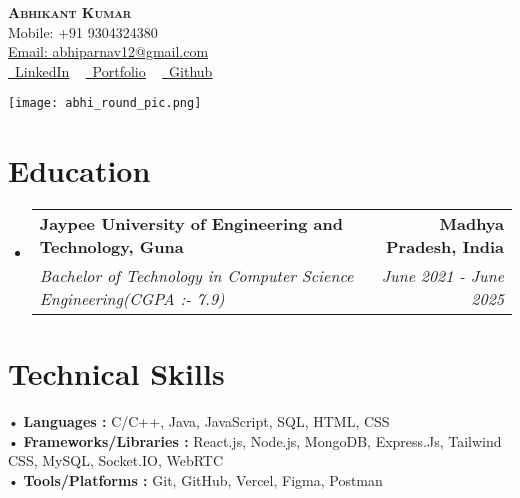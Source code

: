 \documentclass[letterpaper,11pt]{article}
\makeatletter
\newcommand{\resumeSubheading}[4]{
  \vspace{-2pt}\item
	\begin{tabular*}{1.0\textwidth}[t]{l@{\extracolsep{\fill}}r}
  	\textbf{#1} & \textbf{\small #2} \\
  	\textit{\small#3} & \textit{\small #4} \\
	\end{tabular*}\vspace{-7pt}
}
\newcommand{\resumeSubHeadingListStart}{\begin{itemize}[leftmargin=0.0in, label={}]}
\newcommand{\resumeSubHeadingListEnd}{\end{itemize}}
\makeatother
\begin{document}
\begin{minipage}[c]{0.4\textwidth}
    {\textbf{\Huge \scshape {Abhikant Kumar}}} \\ \vspace{3pt} 
    {Mobile: +91 9304324380}  \\ \vspace{3pt} 
    {\href{mailto:x@gmail.com}{Email: {abhiparnav12@gmail.com}}}  \\ \vspace{3pt} 
    {\href{https://linkedin.com/in//}{\raisebox{-0.2\height}\faLinkedin\ \underline{LinkedIn}} ~
    \href{https://abhikant-portfolio.netlify.app/}{\raisebox{-0.2\height}\faGlobe\ \underline{Portfolio}} ~ \href{https://github.com/abhikant12}{\raisebox{-0.2\height}\faGithub\ \underline{Github}}}    
\end{minipage}
\hfill
\begin{minipage}[c]{0.52\textwidth}
\begin{flushright}
    \texttt{[image: abhi\_round\_pic.png]}
\end{flushright}
\end{minipage}
\vspace{-16pt}

 
\section{Education}
\begin{itemize}[leftmargin=0.12in, label={}]
  \vspace{-6pt}
  \resumeSubHeadingListStart
	\resumeSubheading
  	{Jaypee University of Engineering and Technology, Guna}{Madhya Pradesh, India}
  	{Bachelor of Technology in Computer Science Engineering(CGPA  :-  7.9)}{June 2021 - June 2025}
   \vspace{1pt}
  \resumeSubHeadingListEnd
\end{itemize} 



\section{Technical Skills }
 \begin{itemize}[leftmargin=0.12in, label={}]
        \vspace{2pt}
	\small{\item{
 	\hspace{-5pt}• \textbf{Languages : }{ C/C++, Java, JavaScript, SQL, HTML, CSS } \\  \vspace{5pt}
        \hspace{-5pt}• \textbf{Frameworks/Libraries :}  {React.js, Node.js, MongoDB, Express.Js, Tailwind CSS,  MySQL, Socket.IO, WebRTC   } \\  \vspace{5pt}
        \hspace{-5pt}• \textbf{Tools/Platforms :}  {Git, GitHub, Vercel, Figma, Postman} \\
	}}
 \end{itemize}
 \vspace{-10pt}
\end{document}
